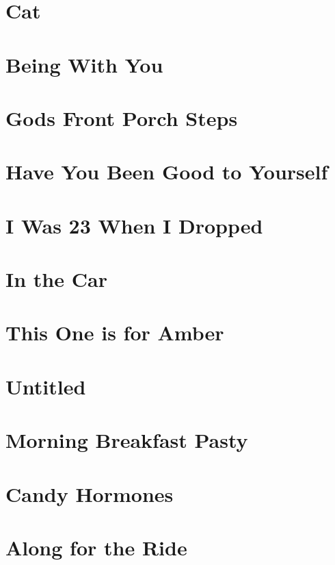 \chapter{Cat}


\chapter{Being With You}


\chapter{Gods Front Porch Steps}


\chapter{Have You Been Good to Yourself}


\chapter{I Was 23 When I Dropped}


\chapter{In the Car}


\chapter{This One is for Amber}


\chapter{Untitled}


\chapter{Morning Breakfast Pasty}


\chapter{Candy Hormones}


\chapter{Along for the Ride}


